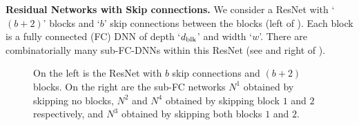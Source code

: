 \textbf{Residual Networks with Skip connections.} We consider a ResNet with `$(b+2)$' blocks and `$b$' skip connections between the blocks (left of ). Each block is a fully connected (FC) DNN of depth `$d_{\text{blk}}$' and width `$w$'. There are combinatorially many sub-FC-DNNs within this ResNet (see  and right of ).
\begin{figure}[t]
\begin{minipage}{0.5\columnwidth}
\end{minipage}
\begin{minipage}{0.5\columnwidth}
\end{minipage}
\caption{\small{On the left is the ResNet with $b$ skip connections and $(b+2)$ blocks. On the right are the sub-FC networks $N^1$ obtained by skipping no blocks, $N^2$ and $N^4$ obtained by skipping block $1$ and $2$ respectively, and $N^3$ obtained by skipping both blocks $1$ and $2$.}}
\label{fig:resnet}
\end{figure}

